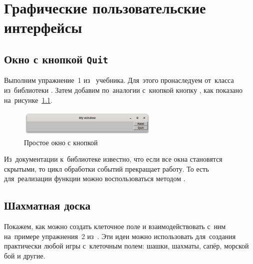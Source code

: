 
\chapter{Графические пользовательские интерфейсы}

\section{Окно с кнопкой \texttt{Quit}}
Выполним упражнение~1 из~ учебника. Для~этого пронаследуем  от~класса  из~библиотеки . Затем добавим по~аналогии с~кнопкой  кнопку , как показано на~рисунке~\ref{fig:mywindow}.

\begin{figure}[ht]
    {\centering
        \includegraphics[width=0.6\textwidth]{images/my_window.png}

    }
    \caption{Простое окно  с кнопкой }
    \label{fig:mywindow}
\end{figure}

Из~документации к~библиотеке  известно, что если все окна становятся скрытыми, то цикл обработки событий прекращает работу. То есть для~реализации функции  можно воспользоваться методом .




\section{Шахматная доска}
Покажем, как можно создать клеточное поле и взаимодействовать с~ним на~примере упражнения~2 из~. Эти идеи можно использовать для~создания практически любой игры с~клеточным полем: шашки, шахматы, сапёр, морской бой и другие.

